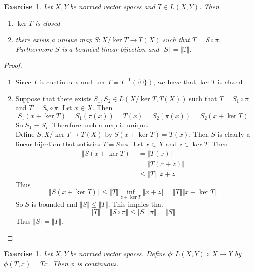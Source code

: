 \documentclass[12pt]{amsart}
\newtheorem{ex}[thm]{Exercise}
\newcommand{\n}{\Vert}
\begin{document}
\begin{ex}
Let $X,Y$ be normed vector spaces and $T \in L(X,Y)$. Then
\begin{enumerate}
\item $\ker T$ is closed
\item there exists a unique map $S :X/ \ker T \rightarrow T(X)$ such that $T = S \circ \pi$. Furthermore $S$ is a bounded linear bijection and $\n S \n = \n T \n$.
\end{enumerate}
\end{ex}

\begin{proof}
\begin{enumerate}
\item Since $T$ is continuous and $\ker T = T^{-1}(\{0\})$, we have that $\ker T$ is closed.
\item Suppose that there exists $S_1,S_2 \in L(X/ \ker T, T(X)) $ such that $T = S_1 \circ \pi$ and  $T = S_2 \circ \pi $. Let $x \in X$. Then $$S_1(x + \ker T) = S_1(\pi(x)) = T(x) = S_2(\pi(x)) = S_2(x + \ker T)$$ So $S_1 = S_2$. Therefore such a map is unique.\\
Define $S: X / \ker T \rightarrow T(X)$ by $S(x+ \ker T) = T(x)$. Then $S$ is clearly a linear bijection that satisfies $T = S \circ \pi$. Let $x \in X$ and $z \in \ker T$. Then 
\begin{align*}
\n S(x+ \ker T) \n
& = \n T(x) \n \\
& = \n T(x+z) \n \\
& \leq \n T \n \n x+ z \n
\end{align*} 
Thus $$\n S(x+ \ker T) \n \leq \n T \n \inf_{z \in \ker T}  \n x + z \n = \n T \n \n x + \ker T \n$$
So $S$ is bounded and $\n S \n \leq \n T \n$. This implies that $$\n T \n = \n S \circ \pi \n \leq \n S \n \n \pi \n = \n S \n$$
Thus $\n S \n = \n T \n$.
\end{enumerate}
\end{proof}

\begin{ex}
Let $X, Y$ be normed vector spaces. Define $\phi: L(X,Y) \times X \rightarrow Y$ by \\$\phi(T,x) = Tx$. Then $\phi$ is continuous.
\end{ex}
\end{document}
